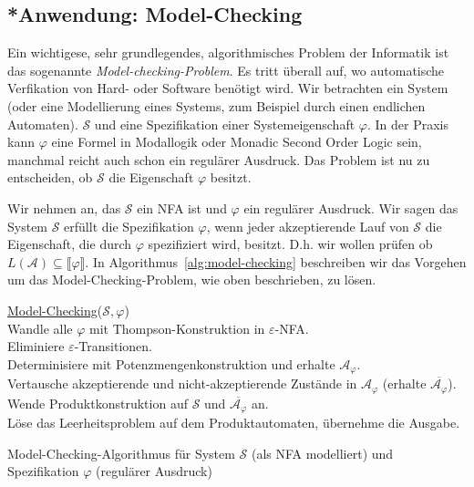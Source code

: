 \documentclass[11pt, a4paper]{article}
\theoremstyle{definition}
\theoremstyle{plain}
\numberwithin{equation}{section}
\newcommand{\comp}[1]{\overline{#1}}
\begin{document}
\subsection{*Anwendung: Model-Checking}\label{sec:regular_model-checking}
Ein wichtigese, sehr grundlegendes, algorithmisches Problem der Informatik ist das sogenannte \textit{Model-checking-Problem}. Es tritt überall auf, wo automatische Verfikation von Hard- oder Software benötigt wird. Wir betrachten ein System (oder eine Modellierung eines Systems, zum Beispiel durch einen endlichen Automaten). $\mathcal{S}$ und eine Spezifikation einer Systemeigenschaft $\varphi$. In der Praxis kann $\varphi$ eine Formel in Modallogik oder Monadic Second Order Logic sein, manchmal reicht auch schon ein regulärer Ausdruck. Das Problem ist nu zu entscheiden, ob $\mathcal{S}$ die Eigenschaft $\varphi$ besitzt.\par
Wir nehmen an, das $\mathcal{S}$ ein NFA ist und $\varphi$ ein regulärer Ausdruck. Wir sagen das System $\mathcal{S}$ erfüllt die Spezifikation $\varphi$, wenn jeder akzeptierende Lauf von $\mathcal{S}$ die Eigenschaft, die durch $\varphi$ spezifiziert wird, besitzt. D.h. wir wollen prüfen ob $L(\mathcal{A}) \subseteq \llbracket \varphi \rrbracket$. In Algorithmus~\ref{alg:model-checking} beschreiben wir das Vorgehen um das Model-Checking-Problem, wie oben beschrieben, zu lösen.
\begin{algorithm}
	\underline{Model-Checking}{($\mathcal{S}, \varphi$)}\\
	Wandle alle $\varphi$ mit Thompson-Konstruktion in $\varepsilon$-NFA.\\
	Eliminiere $\varepsilon$-Transitionen.\\
	Determinisiere mit Potenzmengenkonstruktion und erhalte $\mathcal{A}_\varphi$.\\
	Vertausche akzeptierende und nicht-akzeptierende Zustände in $\mathcal{A}_\varphi$ (erhalte $\comp{\mathcal{A}_\varphi}$).\\
	Wende Produktkonstruktion auf $\mathcal{S}$ und $\comp{\mathcal{A}_\varphi}$ an.\\
	Löse das Leerheitsproblem auf dem Produktautomaten, übernehme die Ausgabe.
	\caption{Model-Checking-Algorithmus für System $\mathcal{S}$ (als NFA modelliert) und Spezifikation $\varphi$ (regulärer Ausdruck)}
	\label{alg:model-checking}
\end{algorithm}
\end{document}

